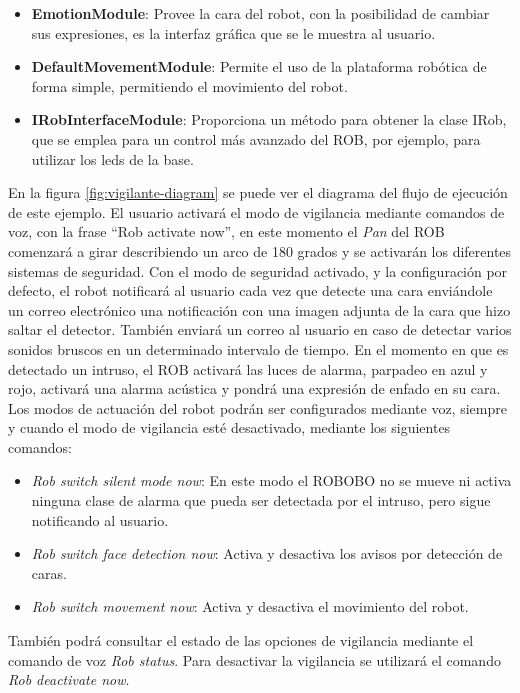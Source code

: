 \begin{itemize}
	\item \textbf{EmotionModule}: Provee la cara del robot, con la posibilidad de cambiar sus expresiones, es la interfaz gráfica que se le muestra al usuario.
	\item \textbf{DefaultMovementModule}: Permite el uso de la plataforma robótica de forma simple, permitiendo el movimiento del robot.
	\item \textbf{IRobInterfaceModule}: Proporciona un método para obtener la clase IRob, que se emplea para un control más avanzado del ROB, por ejemplo, para utilizar los leds de la base.
\end{itemize}
En la figura \ref{fig:vigilante-diagram} se puede ver el diagrama del flujo de ejecución de este ejemplo.
El usuario activará el modo de vigilancia mediante comandos de voz, con la frase \enquote{Rob activate now}, en este momento el \textit{Pan} del ROB comenzará a girar describiendo un arco de 180 grados y se activarán los diferentes sistemas de seguridad.
Con el modo de seguridad activado, y la configuración por defecto, el  robot notificará al usuario cada vez que detecte una cara enviándole un correo electrónico una notificación con una imagen adjunta de la cara que hizo saltar el detector. También enviará un correo al usuario en caso de detectar varios sonidos bruscos en un determinado intervalo de tiempo.
En el momento en que es detectado un intruso, el ROB activará las luces de alarma, parpadeo en azul y rojo, activará una alarma acústica y pondrá una expresión de enfado en su cara.
Los modos de actuación del robot podrán ser configurados mediante voz, siempre y cuando el modo de vigilancia esté desactivado, mediante los siguientes comandos:
\begin{itemize}
	\item \textit{Rob switch silent mode now}: En este modo el ROBOBO no se mueve ni activa ninguna clase de alarma que pueda ser detectada por el intruso, pero sigue notificando al usuario.
	\item \textit{Rob switch face detection now}: Activa y desactiva los avisos por detección de caras.
	\item \textit{Rob switch movement now}: Activa y desactiva el movimiento del robot.
\end{itemize}
También podrá consultar el estado de las opciones de vigilancia mediante el comando de voz \textit{Rob status}.
Para desactivar la vigilancia se utilizará el comando \textit{Rob deactivate now}.

